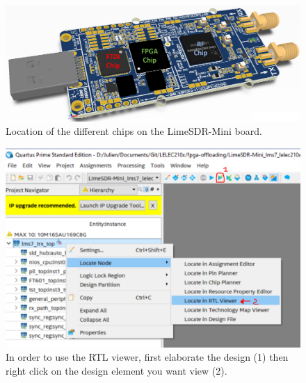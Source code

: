 \begin{figure}[!h]
    \centering
    \includegraphics[width=0.7\linewidth]{figures/limesdrmini_schematic.png}
    \caption{Location of the different chips on the LimeSDR-Mini board.}
    \label{fig:limesdr_mini_schematic}
\end{figure}

\begin{figure}[!h]
    \centering
    \includegraphics[width=0.7\linewidth]{figures/rtl_viewer.png}
    \caption{In order to use the RTL viewer, first elaborate the design (1) then right click on the design element you want view (2).}
    \label{fig:rtl_viewer}
\end{figure}
